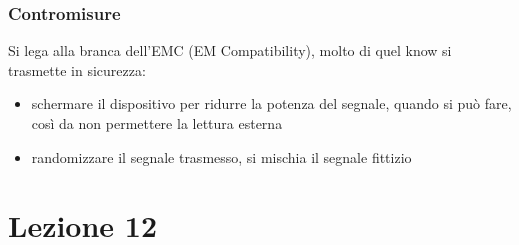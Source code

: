 \documentclass[oneside, 12pt]{extbook}
\begin{document}
\subsection{Contromisure}
Si lega alla branca dell'EMC (EM Compatibility), molto di quel know si trasmette in sicurezza:
\begin{itemize}
	\item schermare il dispositivo per ridurre la potenza del segnale, quando si può fare, così da non permettere la lettura esterna
	\item randomizzare il segnale trasmesso, si mischia il segnale fittizio
\end{itemize}

\chapter{Lezione 12}
\end{document}
